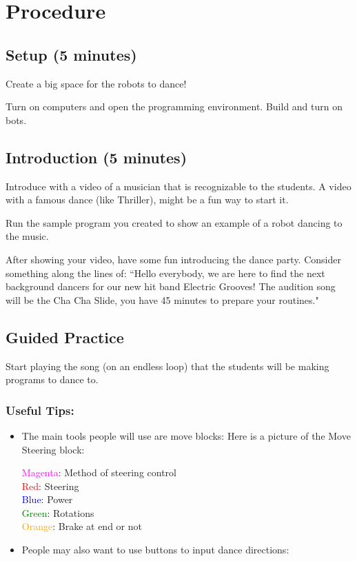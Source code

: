 \documentclass{lessonplan}
\begin{document}
  \section{Procedure}
    \subsection{Setup (5 minutes)}
      Create a big space for the robots to dance!

      Turn on computers and open the programming environment.
      Build and turn on bots.
    \subsection{Introduction (5 minutes)}
      Introduce with a video of a musician that is recognizable to the
      students. A video with a famous dance (like Thriller), might
      be a fun way to start it.

      Run the sample program you created to show an example of a
      robot dancing to the music.

      After showing your video, have some fun introducing the
      dance party. Consider something along the lines of: ``Hello everybody, we are here
      to find the next background dancers for our new hit band
      Electric Grooves! The audition song will be the Cha Cha Slide,
      you have 45 minutes to prepare your routines." 

    \subsection{Guided Practice}
      Start playing the song (on an endless loop) that the students
      will be making programs to dance to.
      
      \subsubsection{Useful Tips:}
      \begin{itemize}
        \item The main tools people will use are move blocks:
          Here is a picture of the Move Steering block:

          \textcolor{magenta}{Magenta}: Method of steering control \hfill \\
          \textcolor{red}{Red}: Steering  \hfill \\
          \textcolor{blue}{Blue}: Power  \hfill \\
          \textcolor{green}{Green}: Rotations  \hfill \\
          \textcolor{orange}{Orange}: Brake at end or not  \hfill \\

        \item People may also want to use buttons to input dance directions:

      \end{itemize}
\end{document}
